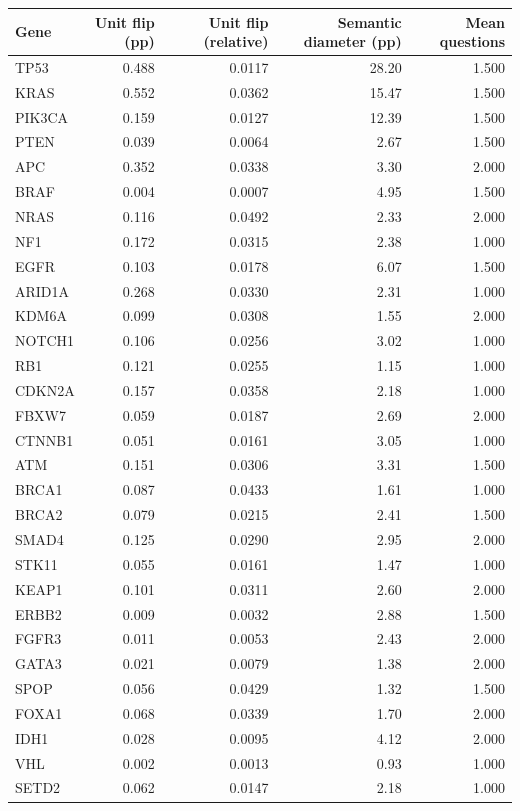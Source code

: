 \begin{longtable}{lrrrr}
\toprule
Gene & Unit flip (pp) & Unit flip (relative) & Semantic diameter (pp) & Mean questions\\
\midrule
\endhead
TP53 & 0.488 & 0.0117 & 28.20 & 1.500\\
KRAS & 0.552 & 0.0362 & 15.47 & 1.500\\
PIK3CA & 0.159 & 0.0127 & 12.39 & 1.500\\
PTEN & 0.039 & 0.0064 & 2.67 & 1.500\\
APC & 0.352 & 0.0338 & 3.30 & 2.000\\
BRAF & 0.004 & 0.0007 & 4.95 & 1.500\\
NRAS & 0.116 & 0.0492 & 2.33 & 2.000\\
NF1 & 0.172 & 0.0315 & 2.38 & 1.000\\
EGFR & 0.103 & 0.0178 & 6.07 & 1.500\\
ARID1A & 0.268 & 0.0330 & 2.31 & 1.000\\
KDM6A & 0.099 & 0.0308 & 1.55 & 2.000\\
NOTCH1 & 0.106 & 0.0256 & 3.02 & 1.000\\
RB1 & 0.121 & 0.0255 & 1.15 & 1.000\\
CDKN2A & 0.157 & 0.0358 & 2.18 & 1.000\\
FBXW7 & 0.059 & 0.0187 & 2.69 & 2.000\\
CTNNB1 & 0.051 & 0.0161 & 3.05 & 1.000\\
ATM & 0.151 & 0.0306 & 3.31 & 1.500\\
BRCA1 & 0.087 & 0.0433 & 1.61 & 1.000\\
BRCA2 & 0.079 & 0.0215 & 2.41 & 1.500\\
SMAD4 & 0.125 & 0.0290 & 2.95 & 2.000\\
STK11 & 0.055 & 0.0161 & 1.47 & 1.000\\
KEAP1 & 0.101 & 0.0311 & 2.60 & 2.000\\
ERBB2 & 0.009 & 0.0032 & 2.88 & 1.500\\
FGFR3 & 0.011 & 0.0053 & 2.43 & 2.000\\
GATA3 & 0.021 & 0.0079 & 1.38 & 2.000\\
SPOP & 0.056 & 0.0429 & 1.32 & 1.500\\
FOXA1 & 0.068 & 0.0339 & 1.70 & 2.000\\
IDH1 & 0.028 & 0.0095 & 4.12 & 2.000\\
VHL & 0.002 & 0.0013 & 0.93 & 1.000\\
SETD2 & 0.062 & 0.0147 & 2.18 & 1.000\\
\bottomrule
\end{longtable}
